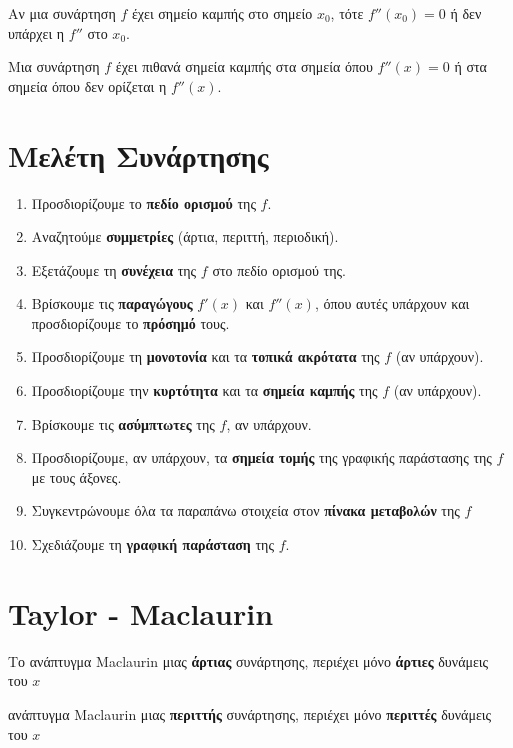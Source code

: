 \begin{prop}
  Αν μια συνάρτηση $f$ έχει σημείο καμπής στο σημείο $ x_{0} $, τότε $ f''(x_{0})=0 $ 
  ή δεν υπάρχει η $f''$ στο $ x_{0} $.
\end{prop}

\begin{rem}
  Μια συνάρτηση $f$ έχει πιθανά σημεία καμπής στα σημεία όπου $ f''(x)=0 $ ή στα 
  σημεία όπου δεν ορίζεται η $ f''(x) $.
\end{rem}

\section*{Μελέτη Συνάρτησης}

\begin{enumerate}
  \item Προσδιορίζουμε το \textbf{πεδίο ορισμού} της $f$.
  \item Αναζητούμε \textbf{συμμετρίες} (άρτια, περιττή, περιοδική).
  \item Εξετάζουμε τη \textbf{συνέχεια} της $f$ στο πεδίο ορισμού της.
  \item Βρίσκουμε τις \textbf{παραγώγους} $ f'(x) $ και $ f''(x) $, όπου αυτές υπάρχουν 
    και προσδιορίζουμε το \textbf{πρόσημό} τους.
  \item Προσδιορίζουμε τη \textbf{μονοτονία} και τα \textbf{τοπικά ακρότατα} της $f$ (αν 
    υπάρχουν).
  \item Προσδιορίζουμε την \textbf{κυρτότητα} και τα \textbf{σημεία καμπής} της $f$ (αν 
    υπάρχουν).
  \item Βρίσκουμε τις \textbf{ασύμπτωτες} της $f$, αν υπάρχουν.
  \item Προσδιορίζουμε, αν υπάρχουν, τα \textbf{σημεία τομής} της γραφικής παράστασης 
    της $f$ με τους άξονες.
  \item Συγκεντρώνουμε όλα τα παραπάνω στοιχεία στον \textbf{πίνακα μεταβολών} της $f$ 
  \item Σχεδιάζουμε τη \textbf{γραφική παράσταση} της $f$.
\end{enumerate}

\section*{Taylor - Maclaurin}

\begin{prop}
\item {}
  \begin{myitemize}
    \item Το ανάπτυγμα Maclaurin μιας \textbf{άρτιας} συνάρτησης, περιέχει μόνο
      \textbf{άρτιες} δυνάμεις του $x$ 
    \item ανάπτυγμα Maclaurin μιας \textbf{περιττής} συνάρτησης, περιέχει μόνο
      \textbf{περιττές} δυνάμεις του $x$ 
  \end{myitemize}
\end{prop}



